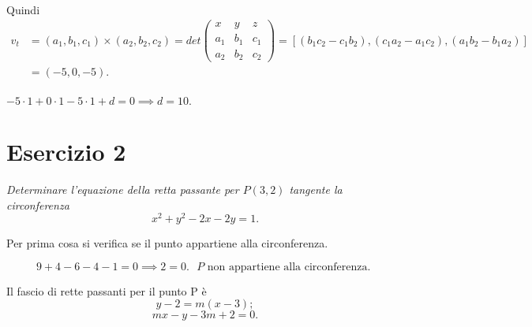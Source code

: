 \documentclass[a4paper]{article}
\begin{document}
        \paragraph{}
        Quindi
        \[
                \begin{aligned}
                        v_t & = (a_1, b_1, c_1) \times (a_2, b_2, c_2) = det\begin{pmatrix}
                                x & y & z \\
                                a_1 & b_1 & c_1 \\
                                a_2 & b_2 & c_2
                        \end{pmatrix} = [ (b_1 c_2 - c_1 b_2), (c_1 a_2 - a_1 c_2), (a_1 b_2 - b_1 a_2)] \\
                        & = (-5, 0, -5).
                \end{aligned}
        \]

        \paragraph{}
        $-5 \cdot 1 + 0 \cdot 1 - 5 \cdot 1 + d = 0 \implies d = 10.$

        \paragraph{}

        \newpage


        \section*{Esercizio 2}
        \textsl{
                Determinare l'equazione della retta passante per $P(3,2)$ tangente la circonferenza
                \[ x^2 + y^2 - 2x -2y = 1. \]
        }

        Per prima cosa si verifica se il punto appartiene alla circonferenza.

        \[
                9 + 4 -6 -4 -1 = 0 \implies 2 = 0. \mbox{ $P$ non appartiene alla circonferenza. }
        \]

        Il fascio di rette passanti per il punto P è
        \[
                y - 2 = m(x - 3);
        \]
        \[
                mx -y -3m + 2 = 0.
        \]
\end{document}
